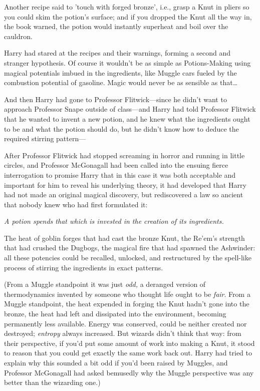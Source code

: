 Another recipe said to 'touch with forged bronze', i.e., grasp a Knut in pliers 
so you could skim the potion's surface; and if you dropped the Knut all the way 
in, the book warned, the potion would instantly superheat and boil over the 
cauldron.

Harry had stared at the recipes and their warnings, forming a second and 
stranger hypothesis. Of course it wouldn't be as simple as Potions-Making using 
magical potentials imbued in the ingredients, like Muggle cars fueled by the 
combustion potential of gasoline. Magic would never be as sensible as 
that{\ldots}

And then Harry had gone to Professor Flitwick---since he didn't want to 
approach Professor Snape outside of class---and Harry had told Professor 
Flitwick that he wanted to invent a new potion, and he knew what the 
ingredients ought to be and what the potion should do, but he didn't know how 
to deduce the required stirring pattern---

After Professor Flitwick had stopped screaming in horror and running in little 
circles, and Professor McGonagall had been called into the ensuing fierce 
interrogation to promise Harry that in this case it was both acceptable and 
important for him to reveal his underlying theory, it had developed that Harry 
had not made an original magical discovery, but rediscovered a law so ancient 
that nobody knew who had first formulated it:

\emph{A potion spends that which is invested in the creation of its 
ingredients.}

The heat of goblin forges that had cast the bronze Knut, the Re'em's strength 
that had crushed the Dugbogs, the magical fire that had spawned the Ashwinder: 
all these potencies could be recalled, unlocked, and restructured by the 
spell-like process of stirring the ingredients in exact patterns.

(From a Muggle standpoint it was just \emph{odd,} a deranged version of 
thermodynamics invented by someone who thought life ought to be \emph{fair}. 
From a Muggle standpoint, the heat expended in forging the Knut hadn't gone 
into the bronze, the heat had left and dissipated into the environment, 
becoming permanently less available. Energy was conserved, could be neither 
created nor destroyed; \emph{entropy} always increased. But wizards didn't 
think that way: from their perspective, if you'd put some amount of work into 
making a Knut, it stood to reason that you could get exactly the same work back 
out. Harry had tried to explain why this sounded a bit odd if you'd been raised 
by Muggles, and Professor McGonagall had asked bemusedly why the Muggle 
perspective was any better than the wizarding one.)

